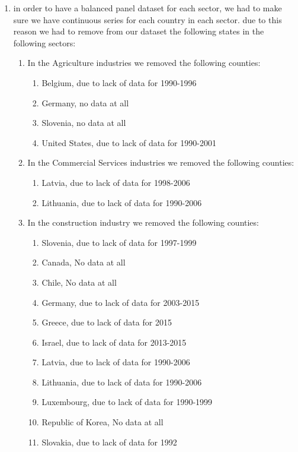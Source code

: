 \documentclass[]{amsart}
\begin{document}
\begin{appendices}
\begin{enumerate}
\begin{description}
  \end{description}
  \item in order to have a balanced panel dataset for each sector, we had to make sure we have continuous series for each country in each sector. due to this reason we had to remove from our dataset the following states in the following sectors: 
  	\begin{enumerate} 
  	\item In the Agriculture industries we removed the following counties:
		\begin{enumerate}   	 
  	  	\item Belgium, due to lack of data for 1990-1996
  	  	\item Germany, no data at all
  	  	\item Slovenia, no data at all
  	  	\item United States, due to lack of data for 1990-2001
  		\end{enumerate}
  	\item In the Commercial Services industries we removed the following counties:
		\begin{enumerate}   	 
  	  	\item Latvia, due to lack of data for 1998-2006
  	  	\item Lithuania, due to lack of data for 1990-2006
  		\end{enumerate}
  	\item In the construction industry we removed the following counties:
		\begin{enumerate}   	 
  	  	\item Slovenia, due to lack of data for 1997-1999
        \item Canada, No data at all
        \item Chile, No data at all
        \item Germany, due to lack of data for 2003-2015
        \item Greece, due to lack of data for 2015
        \item Israel, due to lack of data for 2013-2015
        \item Latvia, due to lack of data for 1990-2006
        \item Lithuania, due to lack of data for 1990-2006
        \item Luxembourg, due to lack of data for 1990-1999
        \item Republic of Korea, No data at all                 
        \item Slovakia, due to lack of data for 1992

\end{enumerate}
\end{enumerate}
\end{enumerate}
\end{appendices}
\end{document}
